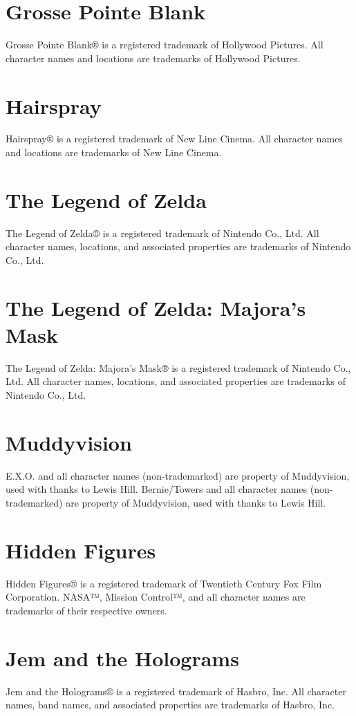 \documentclass[11pt,letterpaper,oldstylefigures]{memoir}
\begin{document}
\section{Grosse Pointe Blank}
Grosse Pointe Blank® is a registered trademark of Hollywood Pictures. All character names and locations are trademarks of Hollywood Pictures.

\section{Hairspray}
Hairspray® is a registered trademark of New Line Cinema. All character names and locations are trademarks of New Line Cinema.

\section{The Legend of Zelda}
The Legend of Zelda® is a registered trademark of Nintendo Co., Ltd. All character names, locations, and associated properties are trademarks of Nintendo Co., Ltd.

\section{The Legend of Zelda: Majora's Mask}
The Legend of Zelda: Majora's Mask® is a registered trademark of Nintendo Co., Ltd. All character names, locations, and associated properties are trademarks of Nintendo Co., Ltd.

\section{Muddyvision}
E.X.O. and all character names (non-trademarked) are property of Muddyvision, used with thanks to Lewis Hill. Bernie/Towers and all character names (non-trademarked) are property of Muddyvision, used with thanks to Lewis Hill.

\section{Hidden Figures}
Hidden Figures® is a registered trademark of Twentieth Century Fox Film Corporation. NASA™, Mission Control™, and all character names are trademarks of their respective owners.

\section{Jem and the Holograms}
Jem and the Holograms® is a registered trademark of Hasbro, Inc. All character names, band names, and associated properties are trademarks of Hasbro, Inc.
\end{document}
